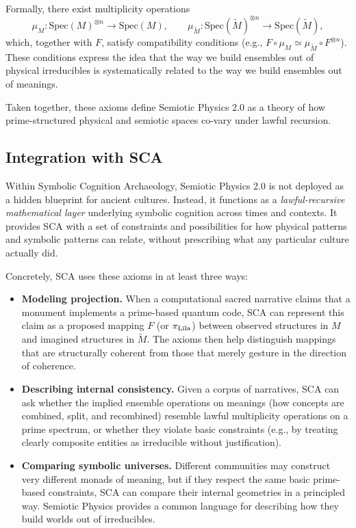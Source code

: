 \documentclass[12]{amsart}
\theoremstyle{plain}
\begin{document}
Formally, there exist multiplicity operations
\[
  \mu_M : \mathrm{Spec}(M)^{\otimes n} \to \mathrm{Spec}(M), \qquad
  \mu_{\tilde M} : \mathrm{Spec}(\tilde M)^{\otimes n} \to \mathrm{Spec}(\tilde M),
\]
which, together with $F$, satisfy compatibility conditions (e.g., $F \circ \mu_M \simeq \mu_{\tilde M} \circ F^{\otimes n}$). These conditions express the idea that the way we build ensembles out of physical irreducibles is systematically related to the way we build ensembles out of meanings.

Taken together, these axioms define Semiotic Physics 2.0 as a theory of how prime-structured physical and semiotic spaces co-vary under lawful recursion.

\subsection{Integration with SCA}

Within Symbolic Cognition Archaeology, Semiotic Physics 2.0 is not deployed as a hidden blueprint for ancient cultures. Instead, it functions as a \emph{lawful-recursive mathematical layer} underlying symbolic cognition across times and contexts. It provides SCA with a set of constraints and possibilities for how physical patterns and symbolic patterns can relate, without prescribing what any particular culture actually did.

Concretely, SCA uses these axioms in at least three ways:

\begin{itemize}
  \item \textbf{Modeling projection.} When a computational sacred narrative claims that a monument implements a prime-based quantum code, SCA can represent this claim as a proposed mapping $F$ (or $\pi_{\text{L\={\i}la}}$) between observed structures in $M$ and imagined structures in $\tilde M$. The axioms then help distinguish mappings that are structurally coherent from those that merely gesture in the direction of coherence.
  \item \textbf{Describing internal consistency.} Given a corpus of narratives, SCA can ask whether the implied ensemble operations on meanings (how concepts are combined, split, and recombined) resemble lawful multiplicity operations on a prime spectrum, or whether they violate basic constraints (e.g., by treating clearly composite entities as irreducible without justification).
  \item \textbf{Comparing symbolic universes.} Different communities may construct very different monads of meaning, but if they respect the same basic prime-based constraints, SCA can compare their internal geometries in a principled way. Semiotic Physics provides a common language for describing how they build worlds out of irreducibles.
\end{itemize}
\end{document}
